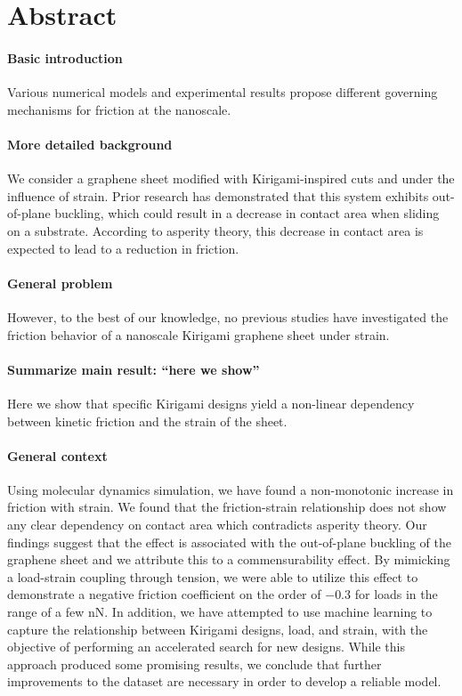 \chapter*{Abstract} 


\subsubsection*{Basic introduction}
Various numerical models and experimental results propose different governing mechanisms for friction at the nanoscale.


\subsubsection*{More detailed background}

We consider a graphene sheet modified with Kirigami-inspired cuts and under the influence of strain. Prior research has demonstrated that this system exhibits out-of-plane buckling, which could result in a decrease in contact area when sliding on a substrate. According to asperity theory, this decrease in contact area is expected to lead to a reduction in friction.


\subsubsection*{General problem}
However, to the best of our knowledge, no previous studies have investigated the friction behavior of a nanoscale Kirigami graphene sheet under strain. 


\subsubsection*{Summarize main result: ``here we show''}
Here we show that specific Kirigami designs yield a non-linear dependency between kinetic friction and the strain of the sheet.


\subsubsection*{General context}
Using molecular dynamics simulation, we have found a non-monotonic increase in friction with strain. We found that the friction-strain relationship does not show any clear dependency on contact area which contradicts asperity theory. Our findings suggest that the effect is associated with the out-of-plane buckling of the graphene sheet and we attribute this to a commensurability effect. By mimicking a load-strain coupling through tension, we were able to utilize this effect to demonstrate a negative friction coefficient on the order of $-0.3$ for loads in the range of a few nN. In addition, we have attempted to use machine learning to capture the relationship between Kirigami designs, load, and strain, with the objective of performing an accelerated search for new designs. While this approach produced some promising results, we conclude that further improvements to the dataset are necessary in order to develop a reliable model.


